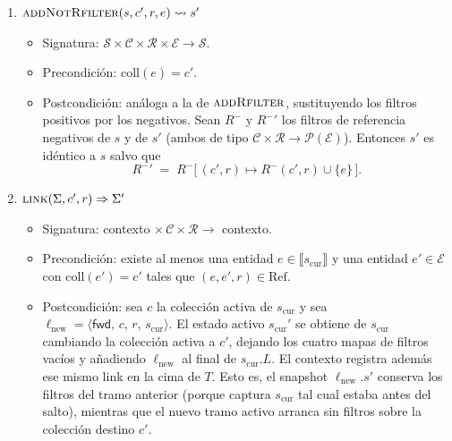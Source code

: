 \begin{enumerate}
  \item $\textsc{addNotRfilter}(s, c', r, e) \rightsquigarrow s'$
    \begin{itemize}
      \item Signatura: $\mathcal{S} \times \mathcal{C} \times \mathcal{R} \times \mathcal{E} \to \mathcal{S}$.
      \item Precondición: $\mathrm{coll}(e) = c'$.
      \item Postcondición: análoga a la de $\textsc{addRfilter}$, sustituyendo los filtros positivos por los
        negativos. Sean $R^{-}$ y $R^{-}{}'$ los filtros de referencia negativos de $s$ y de $s'$ (ambos de
        tipo $\mathcal{C} \times \mathcal{R} \to \mathcal{P}(\mathcal{E})$). Entonces $s'$ es idéntico a $s$
        salvo que
        \[
          R^{-}{}' \;=\; R^{-}\bigl[\,(c', r) \mapsto R^{-}(c', r) \cup \{e\}\,\bigr].
        \]
    \end{itemize}

  \item $\textsc{link}(\Sigma, c', r) \Rightarrow \Sigma'$
    \begin{itemize}
      \item Signatura: contexto $\times\, \mathcal{C} \times \mathcal{R} \to$ contexto.
      \item Precondición: existe al menos una entidad $e \in \llbracket s_{\text{cur}} \rrbracket$ y una
        entidad $e' \in \mathcal{E}$ con $\mathrm{coll}(e') = c'$ tales que $(e, e', r) \in \mathrm{Ref}$.
      \item Postcondición: sea $c$ la colección activa de $s_{\text{cur}}$ y sea
        $\ell_{\text{new}} = \langle \mathsf{fwd},\, c,\, r,\, s_{\text{cur}} \rangle$. El estado activo
        $s_{\text{cur}}'$ se obtiene de $s_{\text{cur}}$ cambiando la colección activa a $c'$, dejando los
        cuatro mapas de filtros vacíos y añadiendo $\ell_{\text{new}}$ al final de $s_{\text{cur}}.L$. El contexto registra
        además ese mismo link en la cima de $T$. Esto es, el snapshot $\ell_{\text{new}}.s'$ conserva los
        filtros del tramo anterior (porque captura $s_{\text{cur}}$ tal cual estaba antes del salto),
        mientras que el nuevo tramo activo arranca sin filtros sobre la colección destino $c'$.
    \end{itemize}


\end{enumerate}

